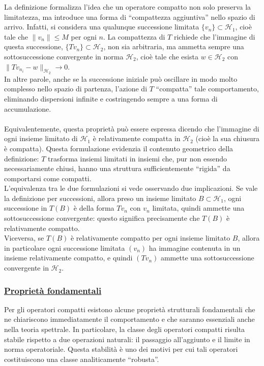 \documentclass[a4paper,12pt]{report}
\begin{document}
La definizione formalizza l’idea che un operatore compatto non solo preserva la limitatezza, ma introduce una forma di “compattezza aggiuntiva” nello spazio di arrivo. Infatti, si considera una qualunque successione limitata \(\{v_n\}\subset \mathscr{H}_1\), cioè tale che \(\|v_n\|\leq M\) per ogni \(n\). La compattezza di \(T\) richiede che l’immagine di questa successione, \(\{Tv_n\}\subset \mathscr{H}_2\), non sia arbitraria, ma ammetta sempre una sottosuccessione convergente in norma \(\mathscr{H}_2\), cioè tale che esista \(w\in\mathscr{H}_2\) con $\|Tv_{n_i}-w\|_{\mathscr{H}_2}\to 0$.
\\In altre parole, anche se la successione iniziale può oscillare in modo molto complesso nello spazio di partenza, l’azione di \(T\) “compatta” tale comportamento, eliminando dispersioni infinite e costringendo sempre a una forma di accumulazione.
\\
\\Equivalentemente, questa proprietà può essere espressa dicendo che l’immagine di ogni insieme limitato di \(\mathscr{H}_1\) è relativamente compatta in \(\mathscr{H}_2\) (cioè la sua chiusura è compatta). Questa formulazione evidenzia il contenuto geometrico della definizione: \(T\) trasforma insiemi limitati in insiemi che, pur non essendo necessariamente chiusi, hanno una struttura sufficientemente “rigida” da comportarsi come compatti.
\\L’equivalenza tra le due formulazioni si vede osservando due implicazioni.  
Se vale la definizione per successioni, allora preso un insieme limitato \(B\subset \mathscr{H}_1\), ogni successione in \(T(B)\) è della forma \(Tv_n\) con \(v_n\) limitata, quindi ammette una sottosuccessione convergente: questo significa precisamente che \(T(B)\) è relativamente compatto.
\\Viceversa, se \(T(B)\) è relativamente compatto per ogni insieme limitato \(B\), allora in particolare ogni successione limitata \((v_n)\) ha immagine contenuta in un insieme relativamente compatto, e quindi \((Tv_n)\) ammette una sottosuccessione convergente in \(\mathscr{H}_2\).

\subsubsection{\underline{Proprietà fondamentali}}

Per gli operatori compatti esistono alcune proprietà strutturali fondamentali che ne chiariscono immediatamente il comportamento e che saranno essenziali anche nella teoria spettrale. In particolare, la classe degli operatori compatti risulta stabile rispetto a due operazioni naturali: il passaggio all’aggiunto e il limite in norma operatoriale. Questa stabilità è uno dei motivi per cui tali operatori costituiscono una classe analiticamente “robusta”.
\end{document}
